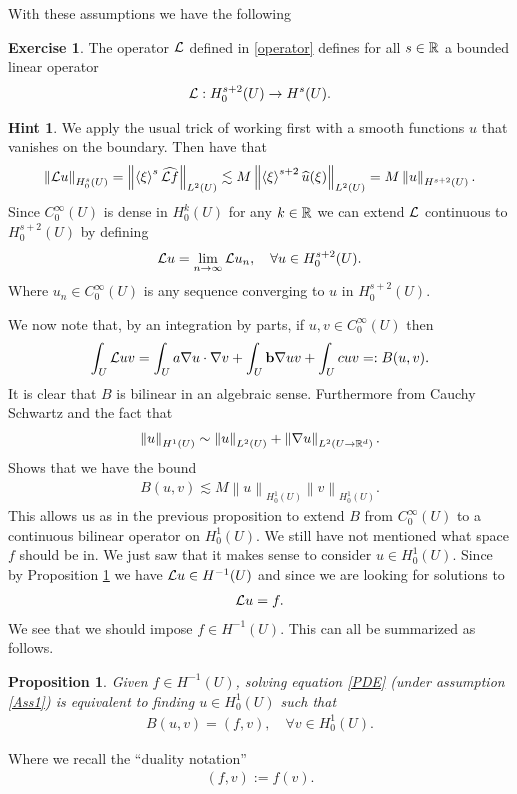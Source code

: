 \documentclass[12pt]{article}
\newtheorem{proposition}[theorem]{Proposition}
\theoremstyle{definition}
\newtheorem{exercise}{Exercise}
\newtheorem*{hint}{Hint}
\newcommand{\br}[1]{\left\langle#1\right\rangle} \newcommand{\set}[1]{\left\{#1\right\}} \newcommand{\qp}[1]{\left(#1\right)}\newcommand{\qb}[1]{\left[#1\right]}
\renewcommand{\norm}[1]{\left\lVert #1 \right\rVert}\renewcommand{\abs}[1]{\left| #1 \right|}
\begin{document}
With these assumptions we have the following
\begin{exercise}\label{domain L}
	The operator $\mathcal{L}$ defined in \eqref{operator} defines for all $s \in \mathbb{R}$ a bounded linear operator
	\begin{align*}
		\mathcal{L} : H_0^{s+2}(U)\to H^s (U).
	\end{align*}
\end{exercise}
\begin{hint}
	We apply the usual trick of working first with a smooth functions $u$ that vanishes on the boundary. Then have that
	\begin{align*}
		\norm{\Ll u}_{H^s_0(U)}=\norm{\br{\xi }^s \wh{\Ll f}}_{L^2(U)}\lesssim  M \norm{\br{\xi }^{s+2}\wh{u}(\xi )}_{L^2(U)} =M \norm{u}_{H^{s+2}(U)} .
	\end{align*}
	Since $C_0^\infty(U)$ is dense in $H^k_0(U)$ for any $k \in \mathbb{R}$ we can extend $\mathcal{L}$ continuous to $H_0^{s+2}(U)$ by defining
	\begin{align*}
		\mathcal{L} u = \lim_{n \to \infty}\mathcal{L} u_n , \quad\forall u \in  H_0^{s+2}(U).
	\end{align*}
	Where $u_n \in C_0^\infty(U)$ is any sequence converging to $u$ in  $H_0^{s+2}(U)$.
\end{hint}
We now note that, by an integration by parts, if $u,v \in  C_0^\infty(U)$ then \begin{align*}
	\int_{U} \mathcal{L} u v =\int_{U}a \nabla u \cdot \nabla v + \int_{U} \vb{b} \nabla  u v + \int_{U} cuv=: B(u,v)   .
\end{align*}
It is clear that $B$ is bilinear in an algebraic sense. Furthermore from Cauchy Schwartz and  the fact that
\begin{align*}
	\norm{u}_{H^1(U)}\sim \norm{u}_{L^2(U)}+\norm{\nabla u}_{L^2(U\to \R^d)}.
\end{align*}
Shows that we have the bound
\begin{align}\label{cont B}
	B(u,v)\lesssim M \norm{u}_{H_0^1(U)}\norm{v}_{H_0^1(U)}.
\end{align}
This allows us as in the previous proposition to extend $B$ from $C_0^\infty(U)$ to a continuous bilinear operator on  $H^1_0(U)$. We still have not mentioned what space $f$ should be in. We just saw that it makes sense to consider $u \in  H_0^1(U)$. Since by Proposition \ref{domain L} we have $\mathcal{L} u \in H^{-1}(U)$ and since we are looking for solutions to
\begin{align*}
	\mathcal{L} u=f.
\end{align*}
We see that we should impose $f \in H^{-1}(U)$. This can all be summarized as follows.
\begin{proposition}
	Given $f \in  H^{-1}(U)$, solving equation \eqref{PDE} (under assumption \ref{Ass1}) is equivalent to finding $u \in H_0^1(U)$ such that
	\begin{align}\label{reform}
		B(u,v)= (f,v) , \quad\forall v \in  H^{1}_0(U).
	\end{align}
\end{proposition}
Where we recall the ``duality notation''
\begin{align*}
	(f,v):= f(v) .
\end{align*}
\end{document}
